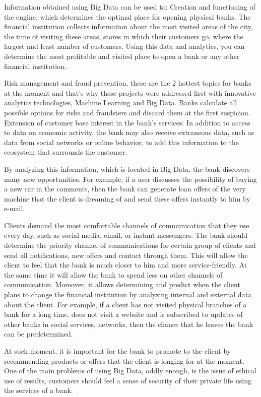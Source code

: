 Information obtained using Big Data can be used to:
Creation and functioning of the engine, which determines the optimal place for opening physical banks.
The financial institution collects information about the most visited areas of the city, the time of visiting these areas,
stores in which their customers go, where the largest and least number of customers.
Using this data and analytics, you can determine the most profitable and
visited place to open a bank or any other financial institution. 

Risk management and fraud prevention, these are the 2 hottest topics for banks at the moment
and that’s why these projects were addressed first with innovative analytics technologies, Machine Learning and Big Data.
Banks calculate all possible options for risks and fraudsters and discard them at the first suspicion.
Extension of customer base interest in the bank's services: In addition to access to data on economic activity, the bank may also receive extraneous data, such as data from social networks or online behavior, to add this information to the ecosystem that surrounds the customer. 

By analyzing this information, which is located in Big Data, the bank discovers many new opportunities.
For example, if a user discusses the possibility of buying a new car in the comments,
then the bank can generate loan offers of the very machine that the client is dreaming of and send these offers instantly to him by e-mail.

Clients demand the most comfortable channels of communication that they use every day, such as social media, email, or instant messengers.
The bank should determine the priority channel of communications for certain group of clients 
and send all notifications, new offers and contact through them.
This will allow the client to feel that the bank is much closer to him and more service-friendly.
At the same time it will allow the bank to spend less on other channels of communication.
Moreover, it allows determining and predict when the client plans to change the financial institution by analyzing internal and external data about the client.
For example, if a client has not visited physical branches of a bank for a long time, does not visit a website and 
is subscribed to updates of other banks in social services, networks, then the chance that he leaves the bank can be predetermined. 

At such moment, it is important for the bank to promote to the client by recommending products 
or offers that the client is longing for at the moment.
One of the main problems of using Big Data, oddly enough, is the issue of ethical use of results, 
customers should feel a sense of security of their private life using the services of a bank.

